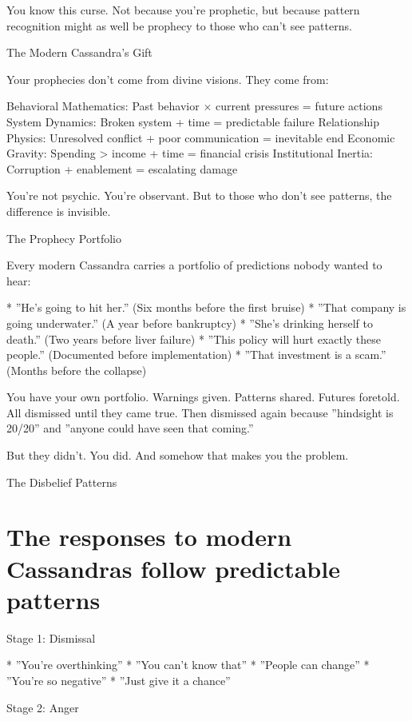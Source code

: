 \documentclass[12pt,oneside]{book}
\begin{document}
You know this curse. Not because you're prophetic, but because pattern recognition might as well be prophecy to those who can't see patterns.

The Modern Cassandra's Gift

Your prophecies don't come from divine visions. They come from:

Behavioral Mathematics: Past behavior × current pressures = future actions System Dynamics: Broken system + time = predictable failure Relationship Physics: Unresolved conflict + poor communication = inevitable end Economic Gravity: Spending > income + time = financial crisis Institutional Inertia: Corruption + enablement = escalating damage

You're not psychic. You're observant. But to those who don't see patterns, the difference is invisible.

The Prophecy Portfolio

Every modern Cassandra carries a portfolio of predictions nobody wanted to hear:

                    * ''He's going to hit her.'' (Six months before the first bruise)
                    * ''That company is going underwater.'' (A year before bankruptcy)
                    * ''She's drinking herself to death.'' (Two years before liver failure)
                    * ''This policy will hurt exactly these people.'' (Documented before implementation)
                    * ''That investment is a scam.'' (Months before the collapse)

You have your own portfolio. Warnings given. Patterns shared. Futures foretold. All dismissed until they came true. Then dismissed again because ''hindsight is 20/20'' and ''anyone could have seen that coming.''

But they didn't. You did. And somehow that makes you the problem.

The Disbelief Patterns

\section{The responses to modern Cassandras follow predictable patterns}

Stage 1: Dismissal

                    * ''You're overthinking''
                    * ''You can't know that''
                    * ''People can change''
                    * ''You're so negative''
                    * ''Just give it a chance''

Stage 2: Anger
\end{document}

